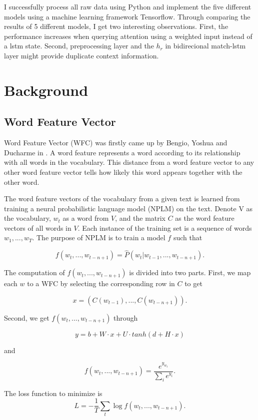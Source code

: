\documentclass[modernstyle,12pt]{sjsuthesis}
\theoremstyle{definition}
\begin{document}
I successfully process all raw data using Python and implement the five different models using a machine learning framework Tensorflow. Through comparing the results of 5 different models, I get two interesting observations. First, the performance increases when querying attention using a weighted input instead of a lstm state. Second, preprocessing layer and the $h_r$ in bidirecional match-lstm layer might provide duplicate context information.



\chapter{Background}
\section{Word Feature Vector}

Word Feature Vector (WFC) was firstly came up by Bengio, Yoshua and Ducharme in \cite{bengio2003neural}. A word feature represents a word according to its relationship with all words in the vocabulary. This distance from a word feature vector to any other word feature vector tells how likely this word appears together with the other word.

The word feature vectors of the vocabulary from a given text is learned from training a neural probabilistic language model (NPLM) on the text. Denote V as the vocabulary, $w_t$ as a word from $V$, and the matrix $C$ as the word feature vectors of all words in $V$. Each instance of the training set is a sequence of words $w_1,...,w_T$. The purpose of NPLM is to train a model $f$ such that

$$ f(w_t, ..., w_{t-n+1}) = \hat{P}(w_t | w_{t-1},...,w_{t-n+1}).$$

The computation of $f(w_t, ..., w_{t-n+1})$ is divided into two parts.
First, we map each $w$ to a WFC by selecting the corresponding row in $C$ to get

$$x=(C(w_{t-1}),... ,C(w_{t-n+1})).$$

Second, we get $f(w_t, ..., w_{t-n+1})$ through

$$y=b+W\cdot x + U\cdot tanh(d + H\cdot x)$$

and

$$ f(w_t, ..., w_{t-n+1}) = \frac{e^{y_{w_t}}}{\sum_{i}^{}e^{y_i}}.$$

The loss function to minimize is $$L = -\frac{1}{T}\sum _{t}^{} \log{f(w_t, ..., w_{t-n+1})}.$$
\end{document}
